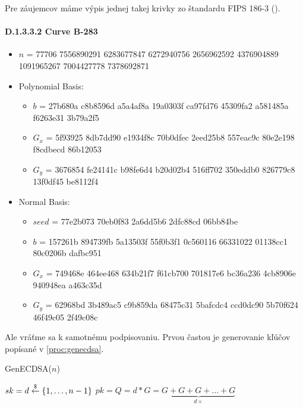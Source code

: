 \begin{poznamka}
    Pre záujemcov máme výpis jednej takej krivky zo štandardu FIPS 186-3
    (\cite{fips186}).
    \paragraph{D.1.3.3.2 Curve B-283}
    \begin{itemize}
        \item $n$ =   77706 7556890291 6283677847 6272940756 2656962592 
                    4376904889 1091965267 7004427778 7378692871
        \item Polynomial Basis:  
            \begin{itemize}
            \item $b$ = 27b680a c8b8596d a5a4af8a 19a0303f ca97fd76 45309fa2 
                    a581485a f6263e31 3b79a2f5  
            \item $G_x$ = 5f93925 8db7dd90 e1934f8c 70b0dfec 2eed25b8 557eac9c 
                    80e2e198 f8cdbecd 86b12053  
            \item $G_y$ = 3676854 fe24141c b98fe6d4 b20d02b4 516ff702 350eddb0 
                    826779c8 13f0df45 be8112f4  
            \end{itemize}
        \item Normal Basis:  
            \begin{itemize}
            \item $seed$ =  77e2b073 70eb0f83 2a6dd5b6 2dfc88cd 06bb84be  
            \item $b$ = 157261b 894739fb 5a13503f 55f0b3f1 0c560116 66331022 
                    01138cc1 80c0206b dafbc951  
            \item $G_x$ = 749468e 464ee468 634b21f7 f61cb700 701817e6 bc36a236 
                    4cb8906e 940948ea a463c35d  
            \item $G_y$ = 62968bd 3b489ac5 c9b859da 68475c31 5bafcdc4 ccd0dc90 
                    5b70f624 46f49c05 2f49c08c  
            \end{itemize}
    \end{itemize}
\end{poznamka}

Ale vráťme sa k samotnému podpisovaniu. Prvou častou je generovanie
kľúčov popísané v \ref{proc:genecdsa}.
\begin{procedure}[!h]
    \caption{GenECDSA($n$)}
    \label{proc:genecdsa}
    $sk = d \overset{\$}{\leftarrow} \{1, \dots, n-1\}$ \;
    $pk = Q = d*G = \underbrace{G+G+G+\dots+G}_{d \times}$ \;
\end{procedure}

